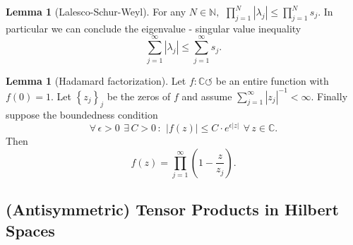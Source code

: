 \documentclass[a4paper]{article}
\newcommand{\bbN}{\mathbb{N}}
\newcommand{\bbC}{\mathbb{C}}
\theoremstyle{definition}
\newtheorem{lemma}[definition]{Lemma}
\theoremstyle{remark}
\theoremstyle{remark}
\begin{document}
\begin{lemma}[Lalesco-Schur-Weyl]
    For any $N \in \bbN,\,\ \prod_{j=1}^N | \lambda_j | \leq \prod_{j=1}^N s_j$. 
    In particular we can conclude the eigenvalue - singular value inequality 
    \begin{equation}
        \sum_{j=1}^{\infty} | \lambda_j | \leq \sum_{j=1}^{\infty} s_j . 
    \end{equation}
\end{lemma}

\begin{lemma}[Hadamard factorization]
    \label{prod}
    Let $f : \bbC \circlearrowleft$ be an entire function with $f(0) = 1$. Let $\left\{ z_j \right\}_j$ be the zeros of $f$ and assume $\sum_{j=1}^{\infty} | z_j |^{-1} < \infty$. Finally suppose the boundedness condition
    \begin{equation}
        \forall\, \epsilon > 0\,\  \exists\, C > 0 \,:\,\ | f(z) | \leq C \cdot e^{\epsilon |z|}\,\ \forall\, z \in \bbC . 
    \end{equation}
    Then 
    \begin{equation}
        f(z) = \prod_{j=1}^{\infty} (1 - \frac{z}{z_j}) . 
    \end{equation}
\end{lemma}

\subsection{(Antisymmetric) Tensor Products in Hilbert Spaces}
\end{document}

